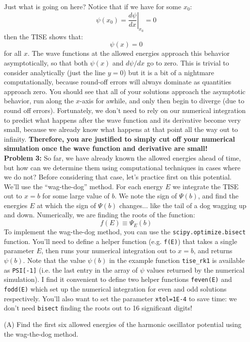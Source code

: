 \documentclass[12pt]{book}
\begin{document}
\noindent
Just what is going on here?  Notice that if we have for some $x_0$:
$$\psi(x_0) = \left.\frac{d\psi}{dx}\right\rvert_{x_0} = 0$$
then the TISE shows that:
$$\psi(x) = 0$$
for all $x$.  The wave functions at the allowed energies approach this behavior asymptotically, so that both $\psi(x)$ and $d\psi/dx$ go to zero.  This is trivial to consider analytically (just the line $y=0$) but it is a bit of a nightmare computationally, because round-off errors will always dominate as quantities approach zero.  You should see that all of your solutions approach the asymptotic behavior, run along the $x$-axis for awhile, and only then begin to diverge (due to round off errors).  Fortunately, we don't need to rely on our numerical integration to predict what happens after the wave function and its derivative become very small, because we already know what happens at that point all the way out to infinity.  {\bf Therefore, you are justified to simply cut off your numerical simulation once the wave function and derivative are small!}\\[5pt]

\noindent
{\bf Problem 3:}
So far, we have already known the allowed energies ahead of time, but how can we determine them using computational techniques in cases where we do not?  Before considering that case, let's practice first on this potential.  We'll use the ``wag-the-dog'' method.  For each energy $E$ we integrate the TISE out to $x=b$ for some large value of $b$.  We note the sign of $\Psi(b)$, and find the energies $E$ at which the sign of $\Psi(b)$ changes... like the tail of a dog wagging up and down.  Numerically, we are finding the roots of the function:
$$f(E) \equiv \Psi_E(b)$$
To implement the wag-the-dog method, you can use the {\tt scipy.optimize.bisect} function.  You'll need to define a helper function (e.g. {\tt f(E)}) that takes a single parameter $E$, then runs your numerical integration out to $x=b$, and returns $\psi(b)$.  Note that the value $\psi(b)$ in the example function {\tt tise\_rk1} is available as {\tt PSI[-1]} (i.e. the last entry in the array of $\psi$ values returned by the numerical simulation).
I find it convenient to define two helper functions {\tt feven(E)} and {\tt fodd(E)} which set up the numerical integration for even and odd solutions respectively.  You'll also want to set the parameter {\tt xtol=1E-4} to save time: we don't need {\tt bisect} finding 
the roots out to 16 significant digits!

\noindent
(A) Find the first six allowed energies of the harmonic oscillator potential using the wag-the-dog method.\\[5pt]
\end{document}
